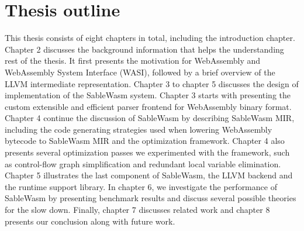 \section*{Thesis outline}

This thesis consists of eight chapters in total, including the introduction chapter. Chapter 2 discusses the background information that helps the understanding rest of the thesis. It first presents the motivation for WebAssembly and WebAssembly System Interface (WASI), followed by a brief overview of the LLVM intermediate representation. Chapter 3 to chapter 5 discusses the design of implementation of the SableWasm system. Chapter 3 starts with presenting the custom extensible and efficient parser frontend for WebAssembly binary format. Chapter 4 continue the discussion of SableWasm by describing SableWasm MIR, including the code generating strategies used when lowering WebAssembly bytecode to SableWasm MIR and the optimization framework. Chapter 4 also presents several optimization passes we experimented with the framework, such as control-flow graph simplification and redundant local variable elimination. Chapter 5 illustrates the last component of SableWasm, the LLVM backend and the runtime support library. In chapter 6, we investigate the performance of SableWasm by presenting benchmark results and discuss several possible theories for the slow down. Finally, chapter 7 discusses related work and chapter 8 presents our conclusion along with future work. 